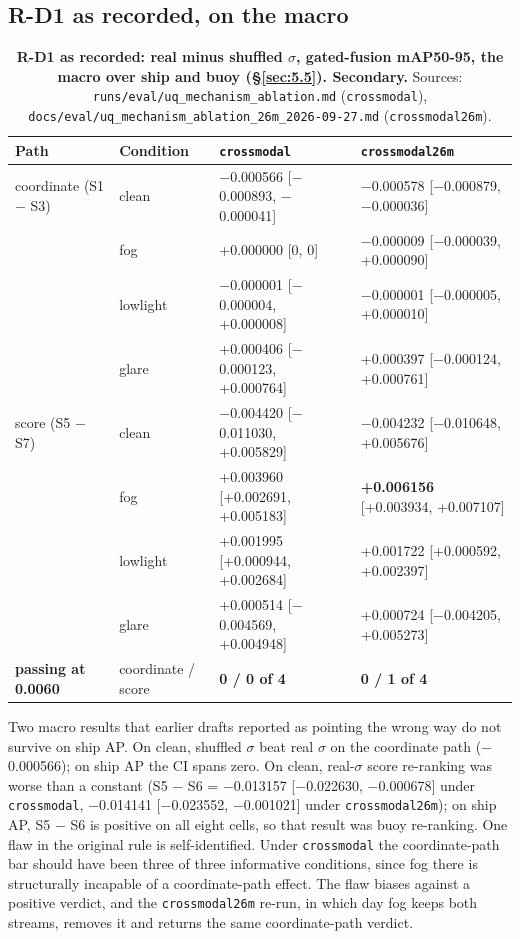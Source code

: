 \documentclass[10pt]{article}
\begin{document}
\subsection{R-D1 as recorded, on the macro}\label{app:H.1}
\begin{table}[htbp]
\centering
\small
\caption{\textbf{R-D1 as recorded: real minus shuffled $\sigma$, gated-fusion mAP50-95, the macro over ship and buoy (\S\ref{sec:5.5}). Secondary.} Sources: \texttt{runs/\allowbreak{}eval/\allowbreak{}uq\_\allowbreak{}mechanism\_\allowbreak{}ablation.md} (\texttt{crossmodal}), \texttt{docs/\allowbreak{}eval/\allowbreak{}uq\_\allowbreak{}mechanism\_\allowbreak{}ablation\_\allowbreak{}26m\_\allowbreak{}2026-09-27.md} (\texttt{crossmodal26m}).}
\label{tab:4c}
\begin{tabularx}{\linewidth}{ll>{\raggedright\arraybackslash}X>{\raggedright\arraybackslash}X}
\toprule
Path & Condition & \texttt{crossmodal} & \texttt{crossmodal26m} \\
\midrule
coordinate (S1 $-$ S3) & clean & $-$0.000566 [$-$0.000893, $-$0.000041] & $-$0.000578 [$-$0.000879, $-$0.000036] \\
 & fog & +0.000000 [0, 0] & $-$0.000009 [$-$0.000039, +0.000090] \\
 & lowlight & $-$0.000001 [$-$0.000004, +0.000008] & $-$0.000001 [$-$0.000005, +0.000010] \\
 & glare & +0.000406 [$-$0.000123, +0.000764] & +0.000397 [$-$0.000124, +0.000761] \\
score (S5 $-$ S7) & clean & $-$0.004420 [$-$0.011030, +0.005829] & $-$0.004232 [$-$0.010648, +0.005676] \\
 & fog & +0.003960 [+0.002691, +0.005183] & \textbf{+0.006156} [+0.003934, +0.007107] \\
 & lowlight & +0.001995 [+0.000944, +0.002684] & +0.001722 [+0.000592, +0.002397] \\
 & glare & +0.000514 [$-$0.004569, +0.004948] & +0.000724 [$-$0.004205, +0.005273] \\
\textbf{passing at 0.0060} & coordinate / score & \textbf{0 / 0 of 4} & \textbf{0 / 1 of 4} \\
\bottomrule
\end{tabularx}
\end{table}
Two macro results that earlier drafts reported as pointing the wrong way do not survive on ship AP. On clean, shuffled $\sigma$ beat real $\sigma$ on the coordinate path ($-$0.000566); on ship AP the CI spans zero. On clean, real-$\sigma$ score re-ranking was worse than a constant (S5 $-$ S6 = $-$0.013157 [$-$0.022630, $-$0.000678] under \texttt{crossmodal}, $-$0.014141 [$-$0.023552, $-$0.001021] under \texttt{crossmodal26m}); on ship AP, S5 $-$ S6 is positive on all eight cells, so that result was buoy re-ranking. One flaw in the original rule is self-identified. Under \texttt{crossmodal} the coordinate-path bar should have been three of three informative conditions, since fog there is structurally incapable of a coordinate-path effect. The flaw biases against a positive verdict, and the \texttt{crossmodal26m} re-run, in which day fog keeps both streams, removes it and returns the same coordinate-path verdict.
\end{document}
